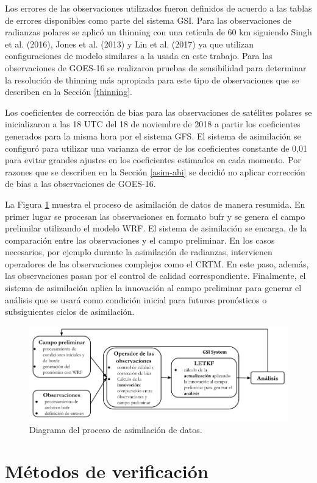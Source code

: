 \documentclass[12pt,oneside,a4paper]{reedthesis}
\begin{document}
Los errores de las observaciones utilizados fueron definidos de acuerdo a las tablas de errores disponibles como parte del sistema GSI. Para las observaciones de radianzas polares se aplicó un thinning con una retícula de 60 km siguiendo Singh et al. (2016), Jones et al. (2013) y Lin et al. (2017) ya que utilizan configuraciones de modelo similares a la usada en este trabajo. Para las observaciones de GOES-16 se realizaron pruebas de sensibilidad para determinar la resolución de thinning más apropiada para este tipo de observaciones que se describen en la Sección \ref{thinning}.

Los coeficientes de corrección de bias para las observaciones de satélites polares se inicializaron a las 18 UTC del 18 de noviembre de 2018 a partir los coeficientes generados para la misma hora por el sistema GFS. El sistema de asimilación se configuró para utilizar una varianza de error de los coeficientes constante de 0,01 para evitar grandes ajustes en los coeficientes estimados en cada momento. Por razones que se describen en la Sección \ref{asim-abi} se decidió no aplicar corrección de bias a las observaciones de GOES-16.

La Figura \ref{fig:flujo-asimilacion} muestra el proceso de asimilación de datos de manera resumida. En primer lugar se procesan las observaciones en formato bufr y se genera el campo prelimilar utilizando el modelo WRF. El sistema de asimilación se encarga, de la comparación entre las observaciones y el campo preliminar. En los casos necesarios, por ejemplo durante la asimilación de radianzas, intervienen operadores de las observaciones complejos como el CRTM. En este paso, además, las observaciones pasan por el control de calidad correspondiente. Finalmente, el sistema de asimilación aplica la innovación al campo preliminar para generar el análisis que se usará como condición inicial para futuros pronósticos o subsiguientes ciclos de asimilación.


\begin{figure}
\includegraphics[width=1\linewidth,]{figure/flujo} \caption{Diagrama del proceso de asimilación de datos.}\label{fig:flujo-asimilacion}
\end{figure}
\hypertarget{muxe9todos-de-verificaciuxf3n}{%
\section{Métodos de verificación}\label{muxe9todos-de-verificaciuxf3n}}
\end{document}
